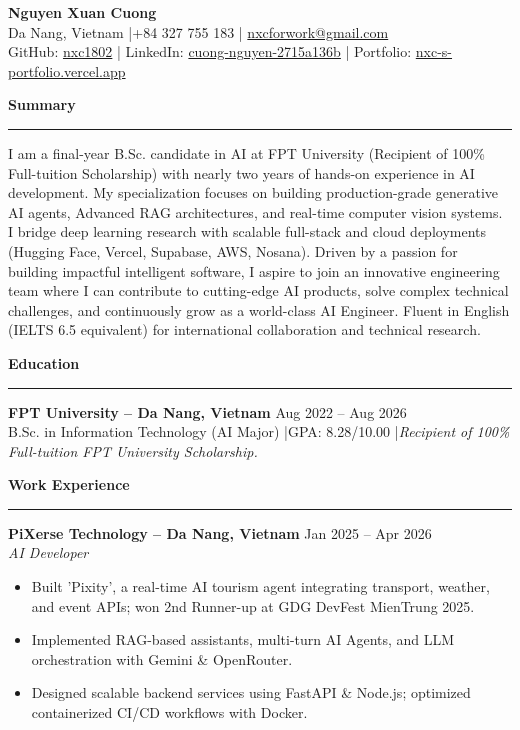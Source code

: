 \documentclass[10pt,a4paper]{article}
\newcommand{\sectionhr}[1]{%
  \vspace{0.4em}\noindent\textbf{\large #1}\par
  \vspace{0.2em}\hrule\vspace{0.4em}
}
\begin{document}
\begin{center}
    {\LARGE \textbf{Nguyen Xuan Cuong}}\\[2pt]
    Da Nang, Vietnam \quad|\quad +84 327 755 183 \quad|\quad
    \href{mailto:nxcforwork@gmail.com}{nxcforwork@gmail.com} \\
    GitHub: \href{https://github.com/nxc1802}{nxc1802} \quad|\quad
    LinkedIn: \href{https://www.linkedin.com/in/cuong-nguyen-2715a136b}{cuong-nguyen-2715a136b} \quad|\quad
    Portfolio: \href{https://nxc-s-portfolio.vercel.app/}{nxc-s-portfolio.vercel.app}
\end{center}

\sectionhr{Summary}
I am a final-year B.Sc. candidate in AI at FPT University (Recipient of 100\% Full-tuition Scholarship) with nearly two years of hands-on experience in AI development. My specialization focuses on building production-grade generative AI agents, Advanced RAG architectures, and real-time computer vision systems. I bridge deep learning research with scalable full-stack and cloud deployments (Hugging Face, Vercel, Supabase, AWS, Nosana). Driven by a passion for building impactful intelligent software, I aspire to join an innovative engineering team where I can contribute to cutting-edge AI products, solve complex technical challenges, and continuously grow as a world-class AI Engineer. Fluent in English (IELTS 6.5 equivalent) for international collaboration and technical research.

\sectionhr{Education}
\textbf{FPT University – Da Nang, Vietnam} \hfill Aug 2022 -- Aug 2026 \\
B.Sc. in Information Technology (AI Major) \quad|\quad GPA: 8.28/10.00 \quad|\quad \emph{Recipient of 100\% Full-tuition FPT University Scholarship.}

\sectionhr{Work Experience}

\textbf{PiXerse Technology – Da Nang, Vietnam} \hfill Jan 2025 -- Apr 2026 \\
\emph{AI Developer}
\begin{itemize}
\item Built 'Pixity', a real-time AI tourism agent integrating transport, weather, and event APIs; won 2nd Runner-up at GDG DevFest MienTrung 2025.
\item Implemented RAG-based assistants, multi-turn AI Agents, and LLM orchestration with Gemini \& OpenRouter.
\item Designed scalable backend services using FastAPI \& Node.js; optimized containerized CI/CD workflows with Docker.
\end{itemize}
\end{document}
